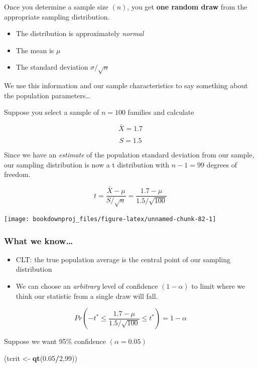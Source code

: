 \documentclass[
]{book}
\newenvironment{Shaded}{\begin{snugshade}}{\end{snugshade}}
\newcommand{\DecValTok}[1]{\textcolor[rgb]{0.00,0.00,0.81}{#1}}
\newcommand{\FloatTok}[1]{\textcolor[rgb]{0.00,0.00,0.81}{#1}}
\newcommand{\FunctionTok}[1]{\textcolor[rgb]{0.13,0.29,0.53}{\textbf{#1}}}
\newcommand{\NormalTok}[1]{#1}
\newcommand{\OtherTok}[1]{\textcolor[rgb]{0.56,0.35,0.01}{#1}}
\newcommand{\SpecialCharTok}[1]{\textcolor[rgb]{0.81,0.36,0.00}{\textbf{#1}}}
\begin{document}
Once you determine a sample size \((n)\), you get \textbf{one random draw} from the appropriate sampling distribution.

\begin{itemize}
\item
  The distribution is approximately \emph{normal}
\item
  The mean is \(\mu\)
\item
  The standard deviation \(\sigma/\sqrt{n}\)
\end{itemize}

We use this information and our sample characteristics to say something about the population parameters\ldots{}

Suppose you select a sample of \(n=100\) families and calculate

\[\bar{X} = 1.7\]

\[S = 1.5\]

Since we have an \emph{estimate} of the population standard deviation from our sample, our sampling distribution is now a t distribution with \(n-1 = 99\) degrees of freedom.

\[ t = \frac{\bar{X}-\mu}{S/\sqrt{n}}=\frac{1.7-\mu}{1.5/\sqrt{100}}\]

\begin{center}\texttt{[image: bookdownproj\_files/figure-latex/unnamed-chunk-82-1]} \end{center}

\subsubsection*{What we know\ldots{}}\label{what-we-know}

\begin{itemize}
\item
  CLT: the true population average is the central point of our sampling distribution
\item
  We can choose an \emph{arbitrary} level of confidence \((1-\alpha)\) to limit where we think our statistic from a single draw will fall.
\end{itemize}

\[Pr(-t^* \leq \frac{1.7-\mu}{1.5/\sqrt{100}} \leq t^*) = 1-\alpha\]

Suppose we want 95\% confidence \((\alpha = 0.05)\)

\begin{Shaded}
\begin{Highlighting}[]
\NormalTok{(tcrit }\OtherTok{\textless{}{-}} \FunctionTok{qt}\NormalTok{(}\FloatTok{0.05}\SpecialCharTok{/}\DecValTok{2}\NormalTok{,}\DecValTok{99}\NormalTok{))}
\end{Highlighting}
\end{Shaded}
\end{document}
